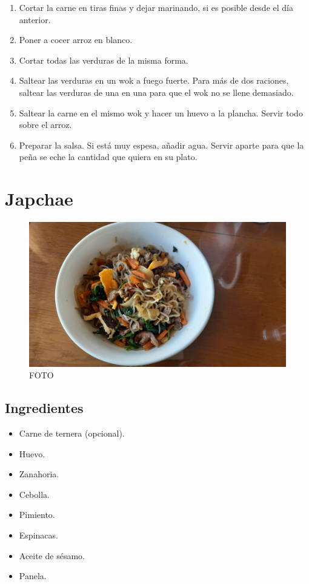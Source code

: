 \documentclass[
]{book}
\providecommand{\tightlist}{%
  \setlength{\itemsep}{0pt}\setlength{\parskip}{0pt}}
\begin{document}
\begin{enumerate}
\def\labelenumi{\arabic{enumi}.}
\tightlist
\item
  Cortar la carne en tiras finas y dejar marinando, si es posible desde el día anterior.
\item
  Poner a cocer arroz en blanco.
\item
  Cortar todas las verduras de la misma forma.
\item
  Saltear las verduras en un wok a fuego fuerte. Para más de dos raciones, saltear las verduras de una en una para que el wok no se llene demasiado.
\item
  Saltear la carne en el mismo wok y hacer un huevo a la plancha. Servir todo sobre el arroz.
\item
  Preparar la salsa. Si está muy espesa, añadir agua. Servir aparte para que la peña se eche la cantidad que quiera en su plato.
\end{enumerate}

\hypertarget{japchae}{%
\chapter{Japchae}\label{japchae}}

\begin{figure}
\centering
\includegraphics{images/japchae.jpg}
\caption{FOTO}
\end{figure}

\hypertarget{ingredientes-6}{%
\section*{Ingredientes}\label{ingredientes-6}}

\begin{itemize}
\tightlist
\item
  Carne de ternera (opcional).
\item
  Huevo.
\item
  Zanahoria.
\item
  Cebolla.
\item
  Pimiento.
\item
  Espinacas.
\item
  Aceite de sésamo.
\item
  Panela.
\end{itemize}
\end{document}
